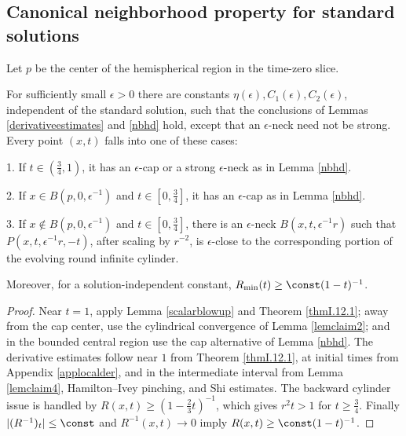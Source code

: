 \subsection{Canonical neighborhood property for standard solutions}
\label{secclaim5}

Let $p$ be the center of the hemispherical region in the time-zero slice.

\begin{lemma}
  \label{lem:kl-canonical-neighborhood-property-standard-solutions-existence-canonical-neighborhoods}
 \label{claim5}
For sufficiently small $\epsilon>0$ there are constants
$\eta(\epsilon),C_1(\epsilon),C_2(\epsilon)$, independent of the standard
solution, such that the conclusions of Lemmas \ref{derivativeestimates} and
\ref{nbhd} hold, except that an $\epsilon$-neck need not be strong. Every
point $(x,t)$ falls into one of these cases:

1. If $t\in(\frac34,1)$, it has an $\epsilon$-cap or a strong
$\epsilon$-neck as in Lemma \ref{nbhd}.

2. If $x\in B(p,0,\epsilon^{-1})$ and $t\in[0,\frac34]$, it has an
$\epsilon$-cap as in Lemma \ref{nbhd}.

3. If $x\notin B(p,0,\epsilon^{-1})$ and $t\in[0,\frac34]$, there is an
$\epsilon$-neck $B(x,t,\epsilon^{-1}r)$ such that
$P(x,t,\epsilon^{-1}r,-t)$, after scaling by $r^{-2}$, is
$\epsilon$-close to the corresponding portion of the evolving round infinite
cylinder.

Moreover, for a solution-independent constant,
$R_{\min}(t)\geq\const(1-t)^{-1}$.
\end{lemma}
\begin{proof}
\sketch Near $t=1$, apply Lemma \ref{scalarblowup} and Theorem
\ref{thmI.12.1}; away from the cap center, use the cylindrical convergence of
Lemma \ref{lemclaim2}; and in the bounded central region use the cap alternative
of Lemma \ref{nbhd}. The derivative estimates follow near $1$ from Theorem
\ref{thmI.12.1}, at initial times from Appendix \ref{applocalder}, and in the
intermediate interval from Lemma \ref{lemclaim4}, Hamilton--Ivey pinching, and
Shi estimates. The backward cylinder issue is handled by
$R(x,t)\geq(1-\frac23t)^{-1}$, which gives $r^2t>1$ for $t\geq\frac34$.
Finally $|(R^{-1})_t|\leq\const$ and $R^{-1}(x,t)\to0$ imply
$R(x,t)\geq\const(1-t)^{-1}$.
\end{proof}

